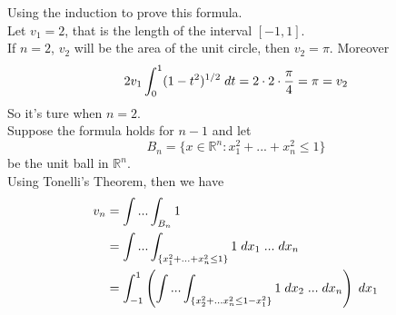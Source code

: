 \documentclass[a4paper,11pt]{article}
\begin{document}
\begin{enumerate}
 		Using the induction to prove this formula.\\
 		Let $v_1 = 2$, that is the length of the interval $[-1,1]$.\\
 		If $n = 2$, $v_2$ will be the area of the unit circle, then $v_2 = \pi$. Moreover
 		$$2v_1 \int_0^1 (1 - t^2)^{1/2} \hspace{0.1cm} dt = 2 \cdot 2 \cdot \frac{\pi}{4} = \pi = v_2$$
 		So it's ture when $n = 2$.\\
 		Suppose the formula holds for $n-1$ and let
 		$$B_n = \{ x \in \mathbb{R}^n : x_1^2 + ... + x_n^2 \leq 1 \}$$
 		be the unit ball in $\mathbb{R}^n$.\\
 		Using Tonelli's Theorem, then we have
 		$$\begin{aligned}
 		v_n
 		&= \int ... \int_{B_n} 1\\
 		&= \int ... \int_{\{ x_1^2 + ... + x_n^2 \leq 1 \}} 1 \hspace{0.1cm} dx_1 \hspace{0.1cm} ... \hspace{0.1cm} dx_n\\
 		&= \int_{-1}^{1}  \left( \int ... \int_{\{ x_2^2 + ... x_n^2 \leq 1 - x_1^2 \}} 1 \hspace{0.1cm} dx_2 \hspace{0.1cm} ... \hspace{0.1cm} dx_n \right) \hspace{0.1cm} dx_1
 		\end{aligned}$$


\end{enumerate}
\end{document}
